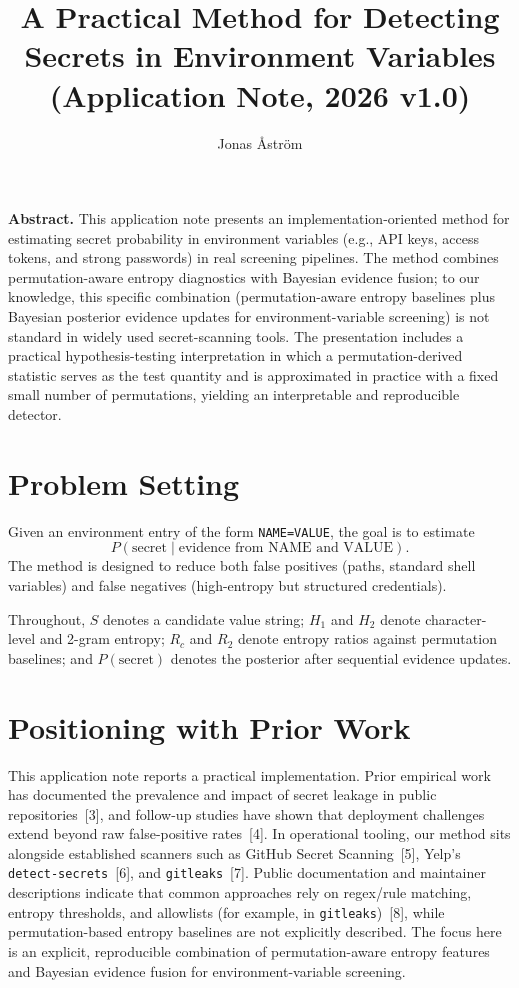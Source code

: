 \documentclass[10pt]{article}
\title{A Practical Method for Detecting Secrets in Environment Variables (Application Note, 2026 v1.0)}
\author{Jonas \r{A}str\"om}
\date{}
\begin{document}
\maketitle

\textbf{Abstract.} This application note presents an implementation-oriented method for estimating secret probability in environment variables (e.g., API keys, access tokens, and strong passwords) in real screening pipelines. The method combines permutation-aware entropy diagnostics with Bayesian evidence fusion; to our knowledge, this specific combination (permutation-aware entropy baselines plus Bayesian posterior evidence updates for environment-variable screening) is not standard in widely used secret-scanning tools. The presentation includes a practical hypothesis-testing interpretation in which a permutation-derived statistic serves as the test quantity and is approximated in practice with a fixed small number of permutations, yielding an interpretable and reproducible detector.

\section*{Problem Setting}

Given an environment entry of the form \texttt{NAME=VALUE}, the goal is to estimate
\[
P(\text{secret}\mid\text{evidence from NAME and VALUE}).
\]
The method is designed to reduce both false positives (paths, standard shell variables) and false negatives (high-entropy but structured credentials).

Throughout, $S$ denotes a candidate value string; $H_1$ and $H_2$ denote character-level and 2-gram entropy; $R_c$ and $R_2$ denote entropy ratios against permutation baselines; and $P(\text{secret})$ denotes the posterior after sequential evidence updates.

\section*{Positioning with Prior Work}

This application note reports a practical implementation. Prior empirical work has documented the prevalence and impact of secret leakage in public repositories~[3], and follow-up studies have shown that deployment challenges extend beyond raw false-positive rates~[4]. In operational tooling, our method sits alongside established scanners such as GitHub Secret Scanning~[5], Yelp's \texttt{detect-secrets}~[6], and \texttt{gitleaks}~[7]. Public documentation and maintainer descriptions indicate that common approaches rely on regex/rule matching, entropy thresholds, and allowlists (for example, in \texttt{gitleaks})~[8], while permutation-based entropy baselines are not explicitly described. The focus here is an explicit, reproducible combination of permutation-aware entropy features and Bayesian evidence fusion for environment-variable screening.
\end{document}
